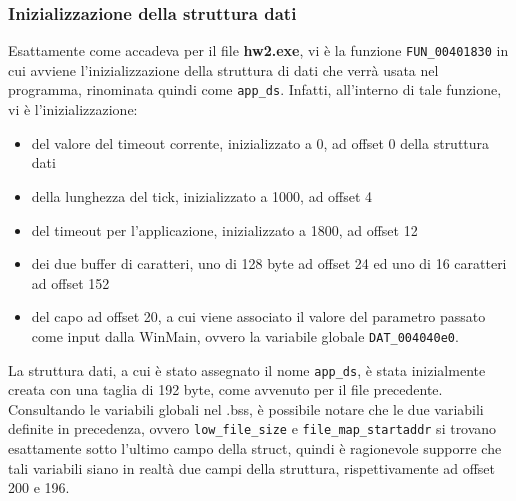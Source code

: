 \documentclass{article}
\begin{document}
\subsubsection{Inizializzazione della struttura dati}
Esattamente come accadeva per il file \textbf{hw2.exe}, vi è la funzione \texttt{FUN\_00401830} in cui avviene l'inizializzazione della struttura di dati che verrà usata nel programma, rinominata quindi come \texttt{app\_ds}. Infatti, all'interno di tale funzione, vi è l'inizializzazione:
\begin{itemize}
\item del valore del timeout corrente, inizializzato a 0, ad offset 0 della struttura dati
\item della lunghezza del tick, inizializzato a 1000, ad offset 4
\item del timeout per l'applicazione, inizializzato a 1800, ad offset 12
\item dei due buffer di caratteri, uno di 128 byte ad offset 24 ed uno di 16 caratteri ad offset 152
\item del capo ad offset 20, a cui viene associato il valore del parametro passato come input dalla WinMain, ovvero la variabile globale \texttt{DAT\_004040e0}.
\end{itemize}
La struttura dati, a cui è stato assegnato il nome \texttt{app\_ds}, è stata inizialmente creata con una taglia di 192 byte, come avvenuto per il file precedente.\\Consultando le variabili globali nel .bss, è possibile notare che le due variabili definite in precedenza, ovvero \texttt{low\_file\_size} e \texttt{file\_map\_startaddr} si trovano esattamente sotto l'ultimo campo della struct, quindi è ragionevole supporre che tali variabili siano in realtà due campi della struttura, rispettivamente ad offset 200 e 196.
\end{document}
